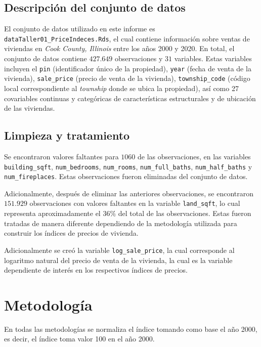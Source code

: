 \documentclass[conference]{IEEEtran}
\begin{document}
\subsection{Descripción del conjunto de datos}

El conjunto de datos utilizado en este informe es \texttt{dataTaller01\_PriceIndeces.Rds}, 
el cual contiene información sobre ventas de viviendas en \textit{Cook County, Illinois} entre los años 2000 y 2020.
En total, el conjunto de datos contiene $427.649$ observaciones y $31$ variables. Estas variables incluyen 
el \texttt{pin} (identificador único de la propiedad), \texttt{year} (fecha de venta de la vivienda),
  \texttt{sale\_price} (precio de venta de la vivienda), \texttt{township\_code} (código local correspondiente al \textit{township} donde se ubica la propiedad),
  así como 27 covariables continuas y categóricas de características estructurales y de ubicación de las viviendas.

\subsection{Limpieza y tratamiento}

Se encontraron valores faltantes para $1060$ de las observaciones, en las variables 
\texttt{building\_sqft}, \texttt{num\_bedrooms}, \texttt{num\_rooms}, \texttt{num\_full\_baths},
\texttt{num\_half\_baths} y \texttt{num\_fireplaces}. Estas observaciones fueron eliminadas del conjunto de datos.

Adicionalmente, después de eliminar las anteriores observaciones, se encontraron $151.929$ observaciones con 
valores faltantes en la variable \texttt{land\_sqft}, lo cual representa aproximadamente el $36\%$ del total de las observaciones.
Estas fueron tratadas de manera diferente dependiendo de la metodología utilizada para construir los índices de precios de vivienda.

Adicionalmente se creó la variable \texttt{log\_sale\_price}, la cual corresponde al logaritmo natural del precio de venta de la vivienda, la 
cual es la variable dependiente de interés en los respectivos índices de precios.

\section{Metodología}

En todas las metodologías se normaliza el índice tomando como base el año 2000, es decir, el índice toma valor 100 en el año 2000.
\end{document}

